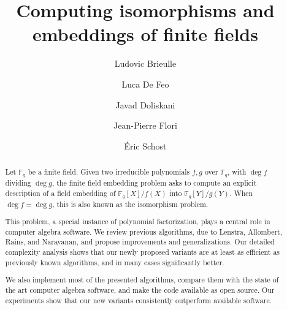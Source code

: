 \documentclass{mcom-l}
\theoremstyle{plain}
\theoremstyle{definition}
\newcommand{\F}{\ensuremath{\mathbb{F}}}
\newcounter{algorithm}
\begin{document}
\title{Computing isomorphisms and embeddings of finite fields}

\author[L. Brieulle]{Ludovic Brieulle}
\address{Laboratoire de Math\'ematiques de Versailles,
  UVSQ, CNRS, Universit\'e Paris-Saclay}

\author[L. De Feo]{Luca De Feo}
\address{Laboratoire de Math\'ematiques de Versailles,
  UVSQ, CNRS
  \& Inria, Universit\'e Paris-Saclay}

\author[J. Doliskani]{Javad Doliskani}
\address{Institute for Quantum Computing, University of Waterloo}

\author[J.-P. Flori]{Jean-Pierre Flori}
\address{Agence nationale de la s\'ecurit\'e des syst\`emes d'information}

\author[\'E. Schost]{\'Eric Schost}
\address{Cheriton School of Computer Science, University of Waterloo}


\begin{abstract}
  Let $\F_q$ be a finite field. %
  Given two irreducible polynomials $f,g$ over $\F_q$, with $\deg f$
  dividing $\deg g$, the finite field embedding problem asks to
  compute an explicit description of a field embedding of
  $\F_q[X]/f(X)$ into $\F_q[Y]/g(Y)$. %
  When $\deg f = \deg g$, this is also known as the isomorphism
  problem.

  This problem, a special instance of polynomial factorization, plays
  a central role in computer algebra software. %
  We review previous algorithms, due to Lenstra, Allombert, Rains, and
  Narayanan, and propose improvements and generalizations. %
  Our detailed complexity analysis shows that our newly proposed
  variants are at least as efficient as previously known algorithms,
  and in many cases significantly better.

  We also implement most of the presented algorithms, compare them
  with the state of the art computer algebra software, and make the
  code available as open source. %
  Our experiments show that our new variants consistently outperform
  available software.
\end{abstract}

\maketitle

\end{document}
